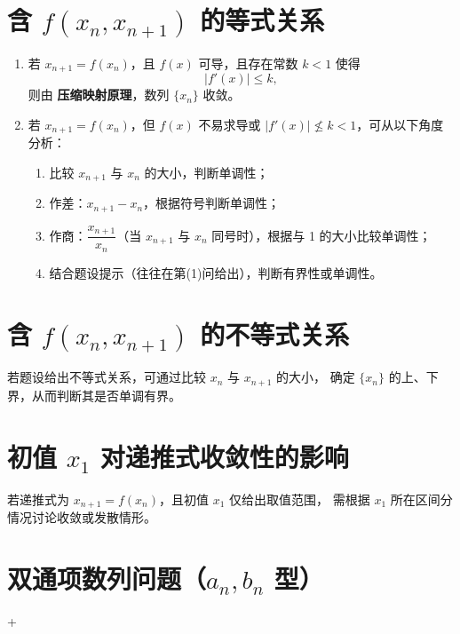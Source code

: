 
\section{含 $f(x_n, x_{n+1})$ 的等式关系}
\DTwoThree

\begin{enumerate}
    \item 若 $x_{n+1} = f(x_n)$，且 $f(x)$ 可导，且存在常数 $k<1$ 使得
          \[
              |f'(x)| \le k,
          \]
          则由 \textbf{压缩映射原理}，数列 $\{x_n\}$ 收敛。

    \item 若 $x_{n+1} = f(x_n)$，但 $f(x)$ 不易求导或 $|f'(x)| \nleq k < 1$，可从以下角度分析：
          \begin{enumerate}
              \item 比较 $x_{n+1}$ 与 $x_n$ 的大小，判断单调性；
              \item 作差：$x_{n+1} - x_n$，根据符号判断单调性；
              \item 作商：$\dfrac{x_{n+1}}{x_n}$（当 $x_{n+1}$ 与 $x_n$ 同号时），根据与 1 的大小比较单调性；
              \item 结合题设提示（往往在第(1)问给出），判断有界性或单调性。
          \end{enumerate}
\end{enumerate}

\section{含 $f(x_n, x_{n+1})$ 的不等式关系}

若题设给出不等式关系，可通过比较 $x_n$ 与 $x_{n+1}$ 的大小，
确定 $\{x_n\}$ 的上、下界，从而判断其是否单调有界。

\section{初值 $x_1$ 对递推式收敛性的影响}

若递推式为 $x_{n+1}=f(x_n)$，且初值 $x_1$ 仅给出取值范围，
需根据 $x_1$ 所在区间分情况讨论收敛或发散情形。

\section{双通项数列问题（$a_n, b_n$ 型）}
\DTwoOne+\DTwoThree

